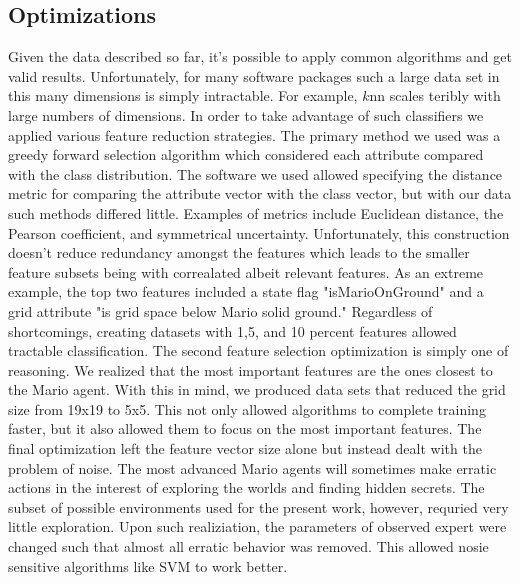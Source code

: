 \documentclass[]{article}   %
\begin{document}
\subsection{Optimizations}
Given the data described so far, it's possible to apply common algorithms and get valid results.  Unfortunately, for many software packages such a large data set in this many dimensions is simply intractable.  For example, $k$nn scales teribly with large numbers of dimensions.  In order to take advantage of such classifiers we applied various feature reduction strategies.
\newline\newline
The primary method we used was a greedy forward selection algorithm which considered each attribute compared with the class distribution.  The software we used allowed specifying the distance metric for comparing the attribute vector with the class vector, but with our data such methods differed little.  Examples of metrics include Euclidean distance, the Pearson coefficient, and symmetrical uncertainty.  Unfortunately, this construction doesn't reduce redundancy amongst the features which leads to the smaller feature subsets being with correalated albeit relevant features.  As an extreme example, the top two features included a state flag "isMarioOnGround" and a grid attribute "is grid space below Mario solid ground."  Regardless of shortcomings, creating datasets with 1,5, and 10 percent features allowed tractable classification.
\newline\newline
The second feature selection optimization is simply one of reasoning.  We realized that the most important features are the ones closest to the Mario agent.  With this in mind, we produced data sets that reduced the grid size from 19x19 to 5x5.  This not only allowed algorithms to complete training faster, but it also allowed them to focus on the most important features.
\newline\newline
The final optimization left the feature vector size alone but instead dealt with the problem of noise.  The most advanced Mario agents will sometimes make erratic actions in the interest of exploring the worlds and finding hidden secrets.  The subset of possible environments used for the present work, however, requried very little exploration.  Upon such realiziation, the parameters of observed expert were changed such that almost all erratic behavior was removed.  This allowed nosie sensitive algorithms like SVM to work better.
\end{document}
